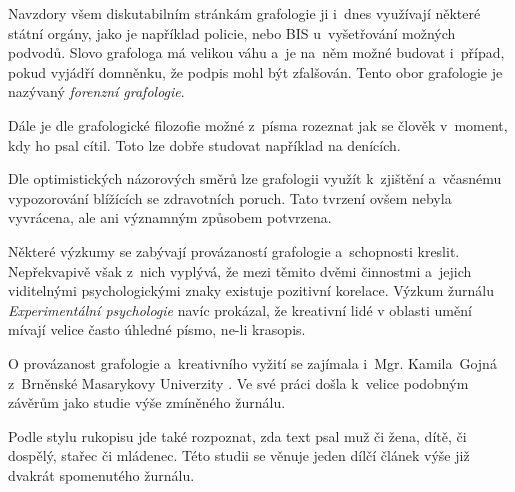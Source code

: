 \documentclass[a4paper, 11pt]{article}
\begin{document}
\par Navzdory všem diskutabilním stránkám grafologie ji i~dnes využívají některé státní orgány, jako je například policie, nebo BIS u~vyšetřování možných podvodů. Slovo grafologa má velikou váhu a~je na~něm možné budovat
i~případ, pokud vyjádří domněnku, že podpis mohl být zfalšován. Tento obor grafologie je nazývaný \textit{forenzní grafologie}. \cite{FORENSE}

\par Dále je dle grafologické filozofie možné z~písma rozeznat jak se člověk v~moment, kdy ho psal cítil. Toto lze dobře studovat například na denících. \cite{MASARNA2}

\par Dle optimistických názorových směrů lze grafologii využít k~zjištění a~včasnému vypozorování blížících se zdravotních poruch. \cite{HEALTH} Tato tvrzení ovšem nebyla vyvrácena, ale ani významným způsobem potvrzena.

\par Některé výzkumy se zabývají provázaností grafologie a~schopnosti kreslit. \cite{PAINT} Nepřekvapivě však z~nich vyplývá, že mezi těmito dvěmi činnostmi a~jejich viditelnými psychologickými znaky existuje pozitivní korelace. Výzkum žurnálu \textit{Experimentální psychologie} \cite{JOEP} navíc prokázal, že kreativní lidé v oblasti umění mívají velice často úhledné písmo, ne-li krasopis.

\par O provázanost grafologie a~kreativního vyžití se zajímala i~Mgr. Kamila~Gojná z~Brněnské Masarykovy Univerzity \cite{MASARNA}. Ve své práci došla k~velice podobným závěrům jako studie výše zmíněného žurnálu.

\par Podle stylu rukopisu jde také rozpoznat, zda text psal muž či žena, dítě, či dospělý, stařec či mládenec. Této studii se věnuje jeden dílčí článek výše již dvakrát spomenutého žurnálu. \cite{GP2}

\newpage

\end{document}
